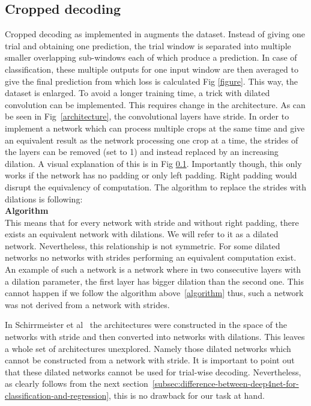 \subsection{Cropped decoding}
Cropped decoding as implemented in \cite{Schirrmeister} augments the dataset.
Instead of giving one trial and obtaining one prediction, the trial window is separated into multiple smaller overlapping sub-windows each of which produce a prediction.
In case of classification, these multiple outputs for one input window are then averaged to give the final prediction from which loss is calculated Fig \ref{figure}.
This way, the dataset is enlarged.
To avoid a longer training time, a trick with dilated convolution can be implemented.
This requires change in the architecture. As can be seen in Fig~\ref{architecture}, the convolutional layers have stride.
In order to implement a network which can process multiple crops at the same time and give an equivalent result as the network processing one crop at a time, the strides of the layers can be removed (set to 1) and instead replaced by an increasing dilation.
A visual explanation of this is in Fig \ref{}.
Importantly though, this only works if the network has no padding or only left padding.
Right padding would disrupt the equivalency of computation.
The algorithm to replace the strides with dilations is following: \\
\textbf{Algorithm}
\\
This means that for every network with stride and without right padding, there exists an equivalent network with dilations.
We will refer to it as a dilated network.
Nevertheless, this relationship is not symmetric.
For some dilated networks no networks with strides performing an equivalent computation exist.
An example of such a network is a network where in two consecutive layers with a dilation parameter, the first layer has bigger dilation than the second one.
This cannot happen if we follow the algorithm above~\ref{algorithm} thus, such a network was not derived from a network with strides.

In Schirrmeister et al~\cite{Schirrmeister_2017} the architectures were constructed in the space of the networks with stride and then converted into networks with dilations.
This leaves a whole set of architectures unexplored.
Namely those dilated networks which cannot be constructed from a network with stride.
It is important to point out that these dilated networks cannot be used for trial-wise decoding.
Nevertheless, as clearly follows from the next section~\ref{subsec:difference-between-deep4net-for-classification-and-regression}, this is no drawback for our task at hand.


